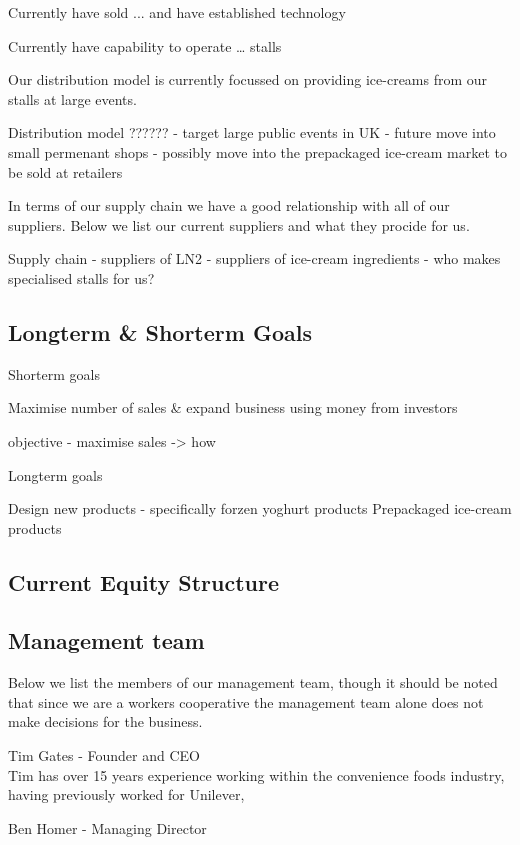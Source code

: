 \documentclass{article}
\begin{document}
Currently have sold ... and have established technology

Currently have capability to operate … stalls


Our distribution model is currently focussed on providing ice-creams from our stalls at large events.

Distribution model ??????
 - target large public events in UK
 - future move into small permenant shops
 - possibly move into the prepackaged ice-cream market to be sold at retailers

In terms of our supply chain we have a good relationship with all of our suppliers. Below we list our current suppliers and what they procide for us.

Supply chain
- suppliers of LN2
- suppliers of ice-cream ingredients
- who makes specialised stalls for us?

  \subsection{Longterm \& Shorterm Goals}

    Shorterm goals

    Maximise number of sales & expand business using money from investors

    objective - maximise sales -> how

    Longterm goals

    Design new products - specifically forzen yoghurt products
    Prepackaged ice-cream products



  \subsection{Current Equity Structure}

  \subsection{Management team}

  Below we list the members of our management team, though it should be noted that since we are a workers cooperative the management team alone does not make decisions for the business.

  Tim Gates - Founder and CEO \\
  Tim has over 15 years experience working within the convenience foods industry, having previously worked for Unilever, 

  Ben Homer - Managing Director
\end{document}
